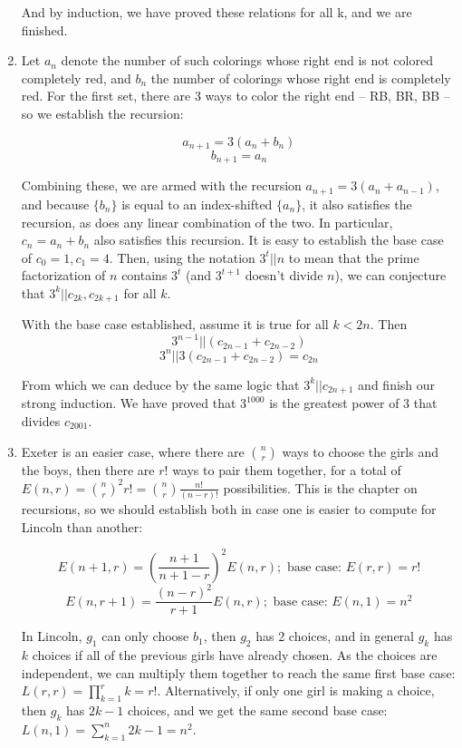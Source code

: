 \documentclass{book}
\numberwithin{equation}{section}
\begin{document}
\begin{enumerate}[label={5.\arabic*}]
And by induction, we have proved these relations for all k, and we are finished.

\item
Let $a_n$ denote the number of such colorings whose right end is not colored completely red, and $b_n$
the number of colorings whose right end is completely red. For the first set, there are 3 ways to color the right
end -- RB, BR, BB -- so we establish the recursion:

$$a_{n+1} = 3(a_n + b_n)$$
$$b_{n+1} = a_n$$

Combining these, we are armed with the recursion $a_{n+1} = 3(a_n + a_{n-1})$, and because $\{b_n\}$ is
equal to an index-shifted $\{a_n\}$, it also satisfies the recursion, as does any linear combination of the two.
In particular, $c_n = a_n + b_n$ also satisfies this recursion. It is easy to establish the base case of $c_0 = 1, c_1 = 4$.
Then, using the notation $3^t || n$ to mean that the prime factorization of $n$ contains $3^t$ (and $3^{t+1}$
doesn't divide $n$), we can conjecture that $3^k || c_{2k}, c_{2k+1}$ for all $k$.

With the base case established, assume it is true for all $k < 2n$. Then
$$3^{n-1} || (c_{2n-1} + c_{2n-2})$$
$$3^n || 3(c_{2n-1} + c_{2n-2}) = c_{2n}$$

From which we can deduce by the same logic that $3^k || c_{2n+1}$ and finish our strong induction. We have
proved that $3^{1000}$ is the greatest power of 3 that divides $c_{2001}$.

\item
Exeter is an easier case, where there are ${n \choose r}$ ways to choose the girls and the boys, then there
are $r!$ ways to pair them together, for a total of $E(n, r) = {n \choose r}^2 r! = {n \choose r}\frac{n!}{(n-r)!}$
possibilities. This is the chapter on recursions, so we should establish both in case one is easier to compute
for Lincoln than another:

$$E(n+1, r) = \left(\frac{n+1}{n+1-r} \right)^2 E(n, r); \text{ base case: } E(r, r) = r!$$
$$E(n, r+1) = \frac{(n-r)^2}{r+1} E(n, r); \text{ base case: } E(n, 1) = n^2$$

In Lincoln, $g_1$ can only choose $b_1$, then $g_2$ has 2 choices, and in general $g_k$ has $k$ choices if
all of the previous girls have already chosen. As the choices are independent, we can multiply them together
to reach the same first base case: $L(r, r) = \prod_{k=1}^r k = r!$. Alternatively, if only one girl is making a choice,
then $g_k$ has $2k-1$ choices, and we get the same second base case: $L(n, 1) = \sum_{k=1}^n 2k-1 = n^2$.


\end{enumerate}
\end{document}

